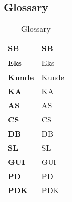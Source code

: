 \subsection{Glossary}

\begin{table}[H]
	\label{glos}
\begin{tabularx}{\textwidth}{|p{4cm}|X|}
\hline
\textbf{\gls{SB}} & \glsdesc{SB}\\\hline
\textbf{\gls{Eks}} & \glsdesc{Eks} \\\hline
\textbf{\gls{Kunde}} & \glsdesc{Kunde} \\\hline
\textbf{\gls{KA}} & \glsdesc{KA} \\\hline
\textbf{\gls{AS}} & \glsdesc{AS} \\\hline
\textbf{\gls{CS}} & \glsdesc{CS} \\\hline
\textbf{\gls{DB}} & \glsdesc{DB} \\\hline
\textbf{\gls{SL}} & \glsdesc{SL} \\\hline
\textbf{\gls{GUI}} & \glsdesc{GUI} \\\hline
\textbf{\gls{PD}} & \glsdesc{PD} \\\hline
\textbf{\gls{PDK}} & \glsdesc{PDK} \\\hline
\end{tabularx}
\caption{Glossary}
\label{tab:ATspk}
\end{table}
